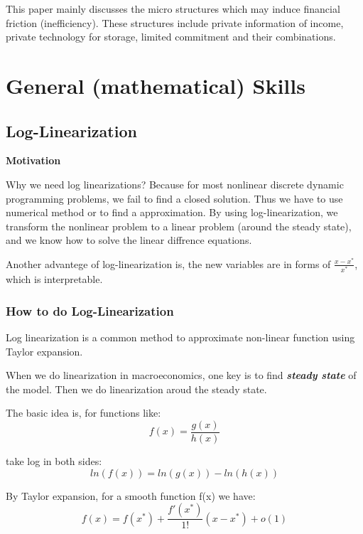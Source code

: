 \documentclass{book}
\theoremstyle{plain}
\theoremstyle{definition}
\begin{document}
This paper mainly discusses the micro structures which may induce financial friction (inefficiency). These structures include private information of income, private technology for storage, limited commitment and their combinations.






\chapter{General (mathematical) Skills} %
\label{cha:general_mathematical_skills}

\section{Log-Linearization}

\noindent
\textbf{Motivation}

Why we need log linearizations?
Because for most nonlinear discrete dynamic programming problems,
we fail to find a closed solution.
Thus we have to use numerical method or to find a approximation.
By using log-linearization,
we transform the nonlinear problem to a linear problem (around the steady state),
and we know how to solve the linear diffrence equations.

Another advantege of log-linearization is,
the new variables are in forms of $\frac{x-x^*}{x^*}$,
which is interpretable.\\


\subsection{How to do Log-Linearization}

Log linearization is a common method to approximate non-linear function using Taylor expansion.

When we do linearization in macroeconomics, one key is to find \emph{\textbf{steady state}} of the model.
Then we do linearization aroud the steady state.

The basic idea is, for functions like:
\[f(x)=\frac{g(x)}{h(x)}\]

take log in both sides:
\[ln(f(x))=ln(g(x))-ln(h(x))\]

By Taylor expansion, for a smooth function f(x) we have:
\[f(x)=f(x^*)+\frac{f'(x^*)}{1!}(x-x^*)+o(1)\]
\end{document}
